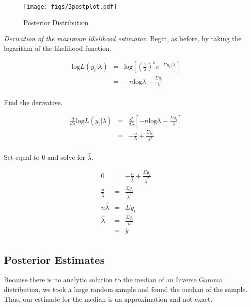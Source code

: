 \documentclass[12pt]{article}
\newcommand{\ybar}{\overline{y}}
\begin{document}
\begin{figure}[H]
\begin{center}
\texttt{[image: figs/3postplot.pdf]}
\caption{Posterior Distribution}
\end{center}
\end{figure}

\noindent \textit{Derivation of the maximum likelihood estimator.}  Begin, as before, by taking the logarithm of the likelihood function.

\begin{eqnarray*}
\mathrm{log}L(y_i|\lambda) &=& \mathrm{log}\left[\left(\frac{1}{\lambda}\right)^ne^{-\Sigma y_i/\lambda}\right] \\
&=& -n\mathrm{log}\lambda-\frac{\Sigma y_i}{\lambda} \\
\end{eqnarray*}

\noindent Find the derivative.

\begin{eqnarray*}
\frac{d}{d\lambda}\mathrm{log}L(y_i|\lambda) &=& \frac{d}{d\lambda}\left[-n\mathrm{log}\lambda-\frac{\Sigma y_i}{\lambda}\right] \\
&=& -\frac{n}{\lambda}+\frac{\Sigma y_i}{\lambda^2} \\
\end{eqnarray*}

\noindent Set equal to 0 and solve for $\hat{\lambda}$.

\begin{eqnarray*}
0 &=& -\frac{n}{\hat{\lambda}}+\frac{\Sigma y_i}{\hat{\lambda}^2} \\
\frac{n}{\hat{\lambda}} &=& \frac{\Sigma y_i}{\hat{\lambda}^2} \\
n\hat{\lambda} &=& \Sigma y_i \\
\hat{\lambda} &=& \frac{\Sigma y_i}{n} \\
&=& \ybar \\
\end{eqnarray*}

\subsection{Posterior Estimates}

\noindent Because there is no analytic solution to the median of an Inverse Gamma distribution, we took a large random sample and found the median of the sample.  Thus, our estimate for the median is an approximation and not exact.
\end{document}
